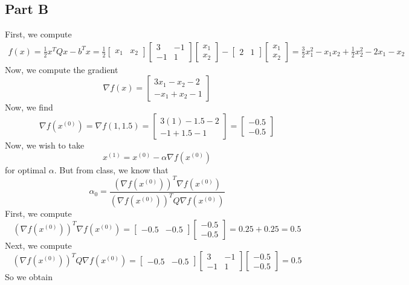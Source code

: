 \documentclass[12pt]{article}
\begin{document}
\subsection*{Part B}
First, we compute
\begin{align*}
f(x) = \frac{1}{2}x^TQx - b^T x = \frac{1}{2}\begin{bmatrix}
x_1 & x_2
\end{bmatrix}
\begin{bmatrix}
3 & -1\\
-1 & 1
\end{bmatrix}
\begin{bmatrix}
x_1\\
x_2
\end{bmatrix}
- \begin{bmatrix}
2 & 1
\end{bmatrix}
\begin{bmatrix}
x_1\\
x_2
\end{bmatrix}
= \frac{3}{2} x_1^2 - x_1x_2 + \frac{1}{2}x_2^2 - 2x_1 - x_2
\end{align*} Now, we compute the gradient 
\[
\nabla f(x) = 
\begin{bmatrix}
3x_1 - x_2 - 2\\
-x_1 + x_2 - 1
\end{bmatrix}
\] Now, we find
\[
\nabla f(x^{(0)}) = \nabla f(1,1.5) = \begin{bmatrix}
3(1) - 1.5 - 2\\
-1 + 1.5 - 1
\end{bmatrix} = 
\begin{bmatrix}
-0.5\\
-0.5
\end{bmatrix}
\] Now, we wish to take
\[
x^{(1)} = x^{(0)} - \alpha \nabla f(x^{(0)}) 
\] for optimal $\alpha$. But from class, we know that 
\[
\alpha_0 = \frac{(\nabla f(x^{(0)}))^T \nabla f(x^{(0)})}{(\nabla f(x^{(0)}))^TQ \nabla f(x^{(0)})}
\] First, we compute 
\[
(\nabla f(x^{(0)}))^T \nabla f(x^{(0)}) = \begin{bmatrix}
-0.5 & -0.5
\end{bmatrix}
\begin{bmatrix}
-0.5 \\
-0.5
\end{bmatrix} = 0.25+0.25 = 0.5
\] Next, we compute 
\[
(\nabla f(x^{(0)}))^TQ \nabla f(x^{(0)}) =
 \begin{bmatrix}
-0.5 & -0.5
\end{bmatrix}
\begin{bmatrix}
3 & -1\\
-1 & 1
\end{bmatrix}
\begin{bmatrix}
-0.5 \\
-0.5
\end{bmatrix}
= 0.5
\] So we obtain
\end{document}
